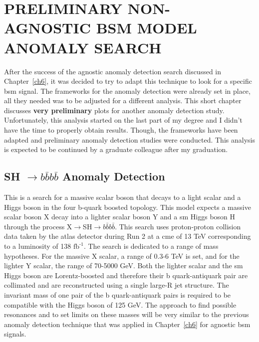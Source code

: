 \begingroup
\clearpage%
\let\clearpage\relax%
\vspace*{-16pt}%
\chapter[PRELIMINARY NON-AGNOSTIC BSM MODEL ANOMALY SEARCH]{PRELIMINARY NON-AGNOSTIC BSM MODEL ANOMALY SEARCH}
\endgroup

After the success of the agnostic anomaly detection search discussed in Chapter~\ref{ch6}, it was decided to try to adapt this technique to look for a specific \gls{bsm} signal. 
The frameworks for the anomaly detection were already set in place, all they needed was to be adjusted for a different analysis. This short chapter discusses \textbf{very preliminary} 
plots for another anomaly detection study. Unfortunately, this analysis started on the last part of my degree and I didn't have the time to properly obtain results.
Though, the frameworks have been adapted and preliminary anomaly detection studies were conducted. This analysis is expected to be continued by a graduate colleague after my 
graduation.

\section{SH $\rightarrow b\bar{b}b\bar{b}$ Anomaly Detection }

This is a search for a massive scalar boson that decays to a light scalar and a Higgs boson in the four b-quark boosted topology. This model expects a massive scalar boson X 
decay into a lighter scalar boson Y and a \gls{sm} Higgs boson H through the process X$\rightarrow$SH$\rightarrow b\bar{b}b\bar{b}$. This search uses proton-proton collision 
data taken by the \gls{atlas} detector during Run 2 at a \gls{cme} of 13 TeV corresponding to a luminosity of 138 $\textrm{fb}^{\textrm{-1}}$. The search is dedicated to 
a range of mass hypotheses. For the massive X scalar, a range of 0.3-6 TeV is set, and for the lighter Y scalar, the range of 70-5000 GeV. Both the lighter scalar and the 
\gls{sm} Higgs boson are Lorentz-boosted and therefore their b quark-antiquark pair are collimated and are reconstructed using a single large-R jet structure. The invariant mass 
of one pair of the b quark-antiquark pairs is required to be compatible with the Higgs boson of 125 GeV. The approach to find possible resonances and to set limits on these 
masses will be very similar to the previous anomaly detection technique that was applied in Chapter~\ref{ch6} for agnostic \gls{bsm} signals. 

